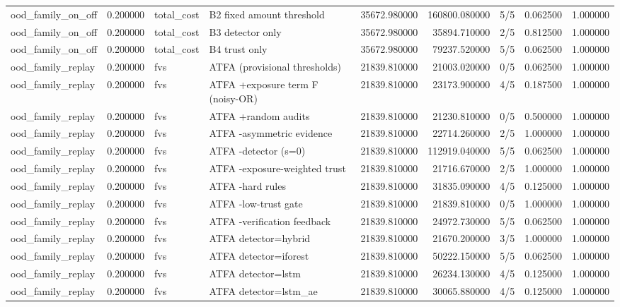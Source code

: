 \begin{tabular}{lrllrrlrr}
ood\_family\_on\_off & 0.200000 & total\_cost & B2 fixed amount threshold & 35672.980000 & 160800.080000 & 5/5 & 0.062500 & 1.000000 \\
ood\_family\_on\_off & 0.200000 & total\_cost & B3 detector only & 35672.980000 & 35894.710000 & 2/5 & 0.812500 & 1.000000 \\
ood\_family\_on\_off & 0.200000 & total\_cost & B4 trust only & 35672.980000 & 79237.520000 & 5/5 & 0.062500 & 1.000000 \\
ood\_family\_replay & 0.200000 & fvs & ATFA (provisional thresholds) & 21839.810000 & 21003.020000 & 0/5 & 0.062500 & 1.000000 \\
ood\_family\_replay & 0.200000 & fvs & ATFA +exposure term F (noisy-OR) & 21839.810000 & 23173.900000 & 4/5 & 0.187500 & 1.000000 \\
ood\_family\_replay & 0.200000 & fvs & ATFA +random audits & 21839.810000 & 21230.810000 & 0/5 & 0.500000 & 1.000000 \\
ood\_family\_replay & 0.200000 & fvs & ATFA -asymmetric evidence & 21839.810000 & 22714.260000 & 2/5 & 1.000000 & 1.000000 \\
ood\_family\_replay & 0.200000 & fvs & ATFA -detector (s=0) & 21839.810000 & 112919.040000 & 5/5 & 0.062500 & 1.000000 \\
ood\_family\_replay & 0.200000 & fvs & ATFA -exposure-weighted trust & 21839.810000 & 21716.670000 & 2/5 & 1.000000 & 1.000000 \\
ood\_family\_replay & 0.200000 & fvs & ATFA -hard rules & 21839.810000 & 31835.090000 & 4/5 & 0.125000 & 1.000000 \\
ood\_family\_replay & 0.200000 & fvs & ATFA -low-trust gate & 21839.810000 & 21839.810000 & 0/5 & 1.000000 & 1.000000 \\
ood\_family\_replay & 0.200000 & fvs & ATFA -verification feedback & 21839.810000 & 24972.730000 & 5/5 & 0.062500 & 1.000000 \\
ood\_family\_replay & 0.200000 & fvs & ATFA detector=hybrid & 21839.810000 & 21670.200000 & 3/5 & 1.000000 & 1.000000 \\
ood\_family\_replay & 0.200000 & fvs & ATFA detector=iforest & 21839.810000 & 50222.150000 & 5/5 & 0.062500 & 1.000000 \\
ood\_family\_replay & 0.200000 & fvs & ATFA detector=lstm & 21839.810000 & 26234.130000 & 4/5 & 0.125000 & 1.000000 \\
ood\_family\_replay & 0.200000 & fvs & ATFA detector=lstm\_ae & 21839.810000 & 30065.880000 & 4/5 & 0.125000 & 1.000000 \\

\end{tabular}
